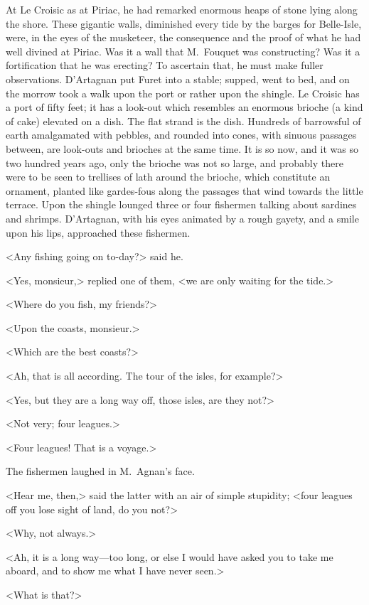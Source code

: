 At Le Croisic as at Piriac, he had remarked enormous heaps of stone lying along the shore. These gigantic walls, diminished every tide by the barges for Belle-Isle, were, in the eyes of the musketeer, the consequence and the proof of what he had well divined at Piriac. Was it a wall that M.~Fouquet was constructing? Was it a fortification that he was erecting? To ascertain that, he must make fuller observations. D'Artagnan put Furet into a stable; supped, went to bed, and on the morrow took a walk upon the port or rather upon the shingle. Le Croisic has a port of fifty feet; it has a look-out which resembles an enormous brioche (a kind of cake) elevated on a dish. The flat strand is the dish. Hundreds of barrowsful of earth amalgamated with pebbles, and rounded into cones, with sinuous passages between, are look-outs and brioches at the same time. It is so now, and it was so two hundred years ago, only the brioche was not so large, and probably there were to be seen to trellises of lath around the brioche, which constitute an ornament, planted like gardes-fous along the passages that wind towards the little terrace. Upon the shingle lounged three or four fishermen talking about sardines and shrimps. D'Artagnan, with his eyes animated by a rough gayety, and a smile upon his lips, approached these fishermen.

<Any fishing going on to-day?> said he.

<Yes, monsieur,> replied one of them, <we are only waiting for the tide.>

<Where do you fish, my friends?>

<Upon the coasts, monsieur.>

<Which are the best coasts?>

<Ah, that is all according. The tour of the isles, for example?>

<Yes, but they are a long way off, those isles, are they not?>

<Not very; four leagues.>

<Four leagues! That is a voyage.>

The fishermen laughed in M.~Agnan's face.

<Hear me, then,> said the latter with an air of simple stupidity; <four leagues off you lose sight of land, do you not?>

<Why, not always.>

<Ah, it is a long way—too long, or else I would have asked you to take me aboard, and to show me what I have never seen.>

<What is that?>

